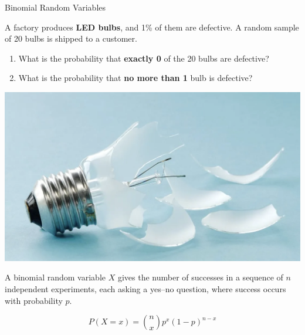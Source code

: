 \documentclass[10pt]{beamer}
\begin{document}
\begin{frame}{Binomial Random Variables}

\begin{myredbox}[title=\text{Problem (Quality Control in Manufacturing)}]

\begin{minipage}{.8\textwidth}
A factory produces \textbf{LED bulbs}, and 1\% of them are defective. A random sample of 20 bulbs is shipped to a customer.
\begin{enumerate}
	\item  What is the probability that \textbf{exactly 0} of the 20 bulbs are defective?  
	\item What is the probability that \textbf{no more than 1} bulb is defective? 
\end{enumerate}
  
\end{minipage} %
\hfill 
\begin{minipage}{.18\textwidth}
\includegraphics[width=\textwidth]{images/broken_bulb}  
\end{minipage} %
 


\end{myredbox}

\vfill \vfill 

\begin{mygreenbox}[title=\text{Tool: Binomial Random Variables}]

A binomial random variable $X$ gives the number of successes in a sequence of $n$ independent experiments, each asking a yes–no question, where success occurs with probability $p$.  

\[ P(X=x) = \binom{n}{x} p^x (1-p)^{n-x} \]
\end{mygreenbox}
\end{frame}
\end{document}
